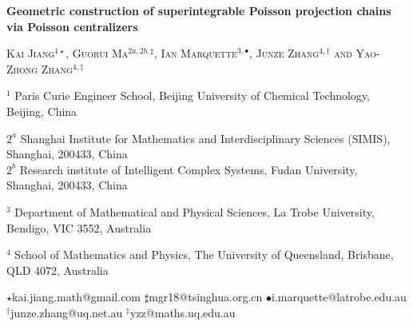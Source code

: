 \documentclass[11pt,reqno]{amsart}
\newtheorem*{theorem A}{Main Theorem A}
\newtheorem*{theorem B}{Main Theorem B}
\newtheorem*{theorem C}{Main Theorem C}
\newtheorem*{theorem D}{Main Theorem D}
\theoremstyle{definition}
\theoremstyle{plain}
\theoremstyle{conclusion}
\begin{document}
 

\thispagestyle{empty}
\begin{center}
	\Large{{\bf  Geometric construction of superintegrable Poisson projection chains via Poisson centralizers }}
\end{center}
 
\vskip 0.3cm
\begin{center}
	\textsc{Kai Jiang$^{1\star}$,  Guorui Ma$^{2a,2b,\sharp}$,    Ian Marquette$^{3,\bullet}$,   Junze Zhang$^{4,\dagger}$  and Yao-Zhong Zhang$^{4,\ddagger}$}
\end{center}
\vskip 0.2cm
\begin{center}
	$^1$   Paris Curie Engineer School, Beijing University of Chemical Technology, Beijing, China
\end{center}
\begin{center}
	$2^a$ Shanghai Institute for Mathematics and Interdisciplinary Sciences (SIMIS), Shanghai, 200433, China  \\
    $2^b$  Research institute of Intelligent Complex Systems, Fudan University, Shanghai, 200433, China 
\end{center}
\begin{center}
	$^3$ Department of Mathematical and Physical Sciences, La Trobe University, Bendigo, VIC 3552, Australia
\end{center}


\begin{center}
	$^4$ School of Mathematics and Physics, The University of Queensland, Brisbane, QLD 4072, Australia
\end{center}

 
\begin{center}
	\footnotesize{ $\star$\textsf{kai.jiang.math@gmail.com} \hskip 0.25cm
    $\sharp$\textsf{mgr18@tsinghua.org.cn} \hskip 0.25cm
    $\bullet$\textsf{i.marquette@latrobe.edu.au} \hskip 0.25cm
 $^\dagger$\textsf{junze.zhang@uq.net.au} \hskip 0.25cm
 $^\ddagger$\textsf{yzz@maths.uq.edu.au}}
\end{center}
\vskip  1cm

 
\end{document}
